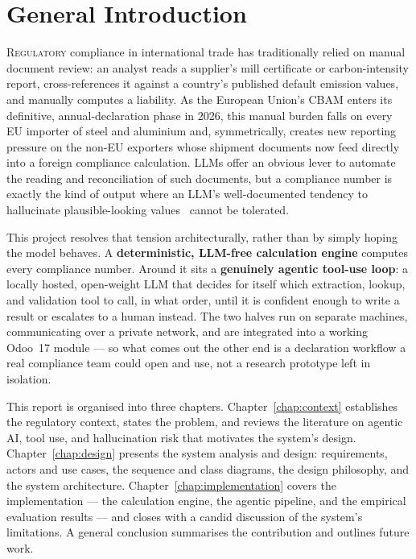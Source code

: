 \chapter*{General Introduction}
\adjustmtc
\thispagestyle{MyStyle}

\lettrine{R}{egulatory} compliance in international trade has traditionally
relied on manual document review: an analyst reads a supplier's mill
certificate or carbon-intensity report, cross-references it against a
country's published default emission values, and manually computes a
liability. As the European Union's \ac{CBAM} enters its definitive,
annual-declaration phase in 2026, this manual burden falls on every EU
importer of steel and aluminium and, symmetrically, creates new reporting
pressure on the non-EU exporters whose shipment documents now feed
directly into a foreign compliance calculation. \acp{LLM} offer an
obvious lever to automate the reading and reconciliation of such
documents, but a
compliance number is exactly the kind of output where an LLM's
well-documented tendency to hallucinate plausible-looking
values~\cite{ji2023hallucination} cannot be tolerated.

This project resolves that tension architecturally, rather than by simply
hoping the model behaves. A \textbf{deterministic, LLM-free calculation
engine} computes every compliance number. Around it sits a
\textbf{genuinely agentic tool-use loop}: a locally hosted, open-weight
LLM that decides for itself which extraction, lookup, and validation tool
to call, in what order, until it is confident enough to write a result or
escalates to a human instead. The two halves run on separate machines,
communicating over a private network, and are integrated into a working
Odoo~17 module --- so what comes out the other end is a declaration
workflow a real compliance team could open and use, not a research
prototype left in isolation.

This report is organised into three chapters. Chapter~\ref{chap:context}
establishes the regulatory context, states the problem, and reviews the
literature on agentic AI, tool use, and hallucination risk that motivates
the system's design. Chapter~\ref{chap:design} presents the system
analysis and design: requirements, actors and use cases, the sequence and
class diagrams, the design philosophy, and the system architecture.
Chapter~\ref{chap:implementation} covers the implementation --- the
calculation engine, the agentic pipeline, and the empirical evaluation
results --- and closes with a candid discussion of the system's
limitations. A general conclusion summarises the contribution and
outlines future work.
